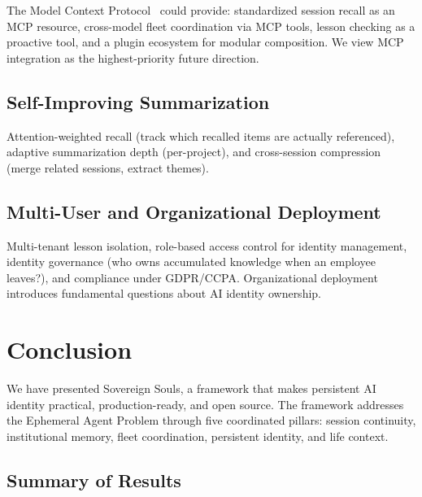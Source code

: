 \documentclass[11pt,a4paper]{article}
\begin{document}
The Model Context Protocol~\citep{mcp2024} could provide: standardized session recall as an MCP resource, cross-model fleet coordination via MCP tools, lesson checking as a proactive tool, and a plugin ecosystem for modular composition. We view MCP integration as the highest-priority future direction.


\subsection{Self-Improving Summarization}
\label{sec:self-improving}

Attention-weighted recall (track which recalled items are actually referenced), adaptive summarization depth (per-project), and cross-session compression (merge related sessions, extract themes).


\subsection{Multi-User and Organizational Deployment}
\label{sec:multi-user}

Multi-tenant lesson isolation, role-based access control for identity management, identity governance (who owns accumulated knowledge when an employee leaves?), and compliance under GDPR/CCPA. Organizational deployment introduces fundamental questions about AI identity ownership.



\section{Conclusion}
\label{sec:conclusion}

We have presented Sovereign Souls, a framework that makes persistent AI identity practical, production-ready, and open source. The framework addresses the Ephemeral Agent Problem through five coordinated pillars: session continuity, institutional memory, fleet coordination, persistent identity, and life context.


\subsection{Summary of Results}
\label{sec:results-summary}
\end{document}
